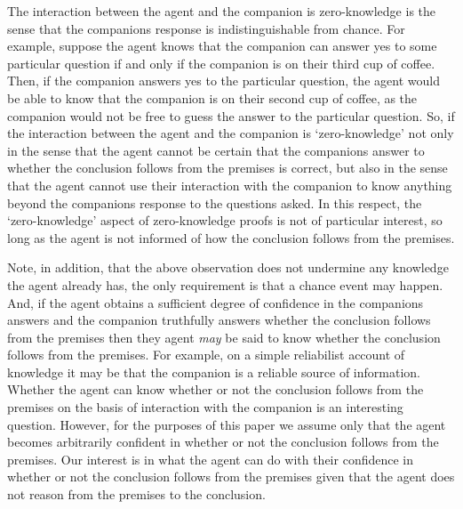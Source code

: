 \documentclass[10pt]{article}
\begin{document}
The interaction between the agent and the companion is zero-knowledge is the sense that the companions response is indistinguishable from chance.
For example, suppose the agent knows that the companion can answer yes to some particular question if and only if the companion is on their third cup of coffee.
Then, if the companion answers yes to the particular question, the agent would be able to know that the companion is on their second cup of coffee, as the companion would not be free to guess the answer to the particular question.
So, if the interaction between the agent and the companion is `zero-knowledge' not only in the sense that the agent cannot be certain that the companions answer to whether the conclusion follows from the premises is correct, but also in the sense that the agent cannot use their interaction with the companion to know anything beyond the companions response to the questions asked.
In this respect, the `zero-knowledge' aspect of zero-knowledge proofs is not of particular interest, so long as the agent is not informed of how the conclusion follows from the premises.

Note, in addition, that the above observation does not undermine any knowledge the agent already has, the only requirement is that a chance event may happen.
And, if the agent obtains a sufficient degree of confidence in the companions answers and the companion truthfully answers whether the conclusion follows from the premises then they agent \emph{may} be said to know whether the conclusion follows from the premises.
For example, on a simple reliabilist account of knowledge it may be that the companion is a reliable source of information.
Whether the agent can know whether or not the conclusion follows from the premises on the basis of interaction with the companion is an interesting question.
However, for the purposes of this paper we assume only that the agent becomes arbitrarily confident in whether or not the conclusion follows from the premises.
Our interest is in what the agent can do with their confidence in whether or not the conclusion follows from the premises given that the agent does not reason from the premises to the conclusion.

\end{document}
